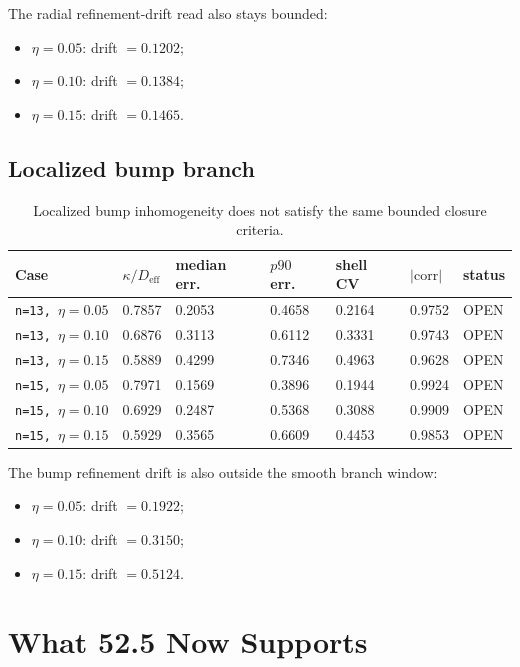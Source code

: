 \documentclass[11pt]{article}
\begin{document}
The radial refinement-drift read also stays bounded:
\begin{itemize}
\item \(\eta = 0.05\): drift \(= 0.1202\);
\item \(\eta = 0.10\): drift \(= 0.1384\);
\item \(\eta = 0.15\): drift \(= 0.1465\).
\end{itemize}

\subsection{Localized bump branch}

\begin{table}[h!]
\centering
\begin{tabular}{@{}p{2.4cm}p{1.4cm}p{1.5cm}p{1.5cm}p{1.4cm}p{1.4cm}p{1.2cm}@{}}
\toprule
Case & \(\kappa/D_{\mathrm{eff}}\) & median err. & \(p90\) err. & shell CV & \(|\mathrm{corr}|\) & status \\
\midrule
\texttt{n=13,\ \(\eta=0.05\)} & 0.7857 & 0.2053 & 0.4658 & 0.2164 & 0.9752 & OPEN \\
\texttt{n=13,\ \(\eta=0.10\)} & 0.6876 & 0.3113 & 0.6112 & 0.3331 & 0.9743 & OPEN \\
\texttt{n=13,\ \(\eta=0.15\)} & 0.5889 & 0.4299 & 0.7346 & 0.4963 & 0.9628 & OPEN \\
\texttt{n=15,\ \(\eta=0.05\)} & 0.7971 & 0.1569 & 0.3896 & 0.1944 & 0.9924 & OPEN \\
\texttt{n=15,\ \(\eta=0.10\)} & 0.6929 & 0.2487 & 0.5368 & 0.3088 & 0.9909 & OPEN \\
\texttt{n=15,\ \(\eta=0.15\)} & 0.5929 & 0.3565 & 0.6609 & 0.4453 & 0.9853 & OPEN \\
\bottomrule
\end{tabular}
\caption{Localized bump inhomogeneity does not satisfy the same bounded closure criteria.}
\end{table}

The bump refinement drift is also outside the smooth branch window:
\begin{itemize}
\item \(\eta = 0.05\): drift \(= 0.1922\);
\item \(\eta = 0.10\): drift \(= 0.3150\);
\item \(\eta = 0.15\): drift \(= 0.5124\).
\end{itemize}

\section{What 52.5 Now Supports}
\end{document}
